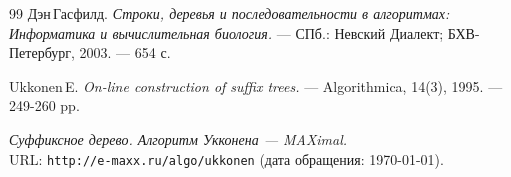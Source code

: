 \begin{thebibliography}{99}
Дэн\,Гасфилд.
{\itshape Строки, деревья и последовательности в алгоритмах: Информатика и вычислительная биология.} --- СПб.: Невский Диалект; БХВ-Петербург, 2003. --- 654 с.

Ukkonen\,E.
{\itshape On-line construction of suffix trees.} --- Algorithmica, 14(3), 1995. --- 249-260 pp.

{\itshape Суффиксное дерево. Алгоритм Укконена — MAXimal.} \\URL: \texttt{http://e-maxx.ru/algo/ukkonen} (дата обращения: \today).
\end{thebibliography}
\pagebreak
